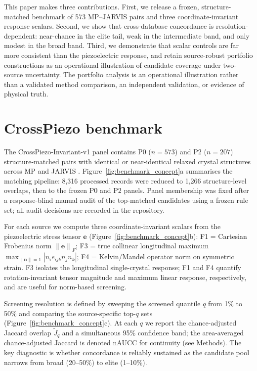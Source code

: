 \documentclass[11pt]{article}
\newcommand{\E}{\mathbf{e}}
\newcommand{\norm}[1]{\left\lVert #1 \right\rVert}
\begin{document}
This paper makes three contributions.
First, we release a frozen, structure-matched benchmark of 573 MP--JARVIS pairs and three coordinate-invariant response scalars.
Second, we show that cross-database concordance is resolution-dependent: near-chance in the elite tail, weak in the intermediate band, and only modest in the broad band.
Third, we demonstrate that scalar controls are far more consistent than the piezoelectric response, and retain source-robust portfolio constructions as an operational illustration of candidate coverage under two-source uncertainty.
The portfolio analysis is an operational illustration rather than a validated method comparison, an independent validation, or evidence of physical truth.

\section{CrossPiezo benchmark}
\label{sec:benchmark}

The CrossPiezo-Invariant-v1 panel contains P0 ($n=573$) and P2 ($n=207$) structure-matched pairs with identical or near-identical relaxed crystal structures across MP and JARVIS \cite{jain2013,ong2013}.
Figure~\ref{fig:benchmark_concept}a summarises the matching pipeline: 8,316 processed records were reduced to 1,266 structure-level overlaps, then to the frozen P0 and P2 panels.
Panel membership was fixed after a response-blind manual audit of the top-matched candidates using a frozen rule set; all audit decisions are recorded in the repository.

For each source we compute three coordinate-invariant scalars from the piezoelectric stress tensor $\E$ (Figure~\ref{fig:benchmark_concept}b):
F1 = Cartesian Frobenius norm $\norm{\E}_F$;
F3 = true collinear longitudinal maximum $\max_{\norm{\bm n}=1} |n_i e_{ijk} n_j n_k|$;
F4 = Kelvin/Mandel operator norm on symmetric strain.
F3 isolates the longitudinal single-crystal response; F1 and F4 quantify rotation-invariant tensor magnitude and maximum linear response, respectively, and are useful for norm-based screening.

Screening resolution is defined by sweeping the screened quantile $q$ from 1\% to 50\% and comparing the source-specific top-$q$ sets (Figure~\ref{fig:benchmark_concept}c).
At each $q$ we report the chance-adjusted Jaccard overlap $\widetilde J_q$ and a simultaneous 95\% confidence band; the area-averaged chance-adjusted Jaccard is denoted nAUCC for continuity (see Methods).
The key diagnostic is whether concordance is reliably sustained as the candidate pool narrows from broad (20--50\%) to elite (1--10\%).
\end{document}
